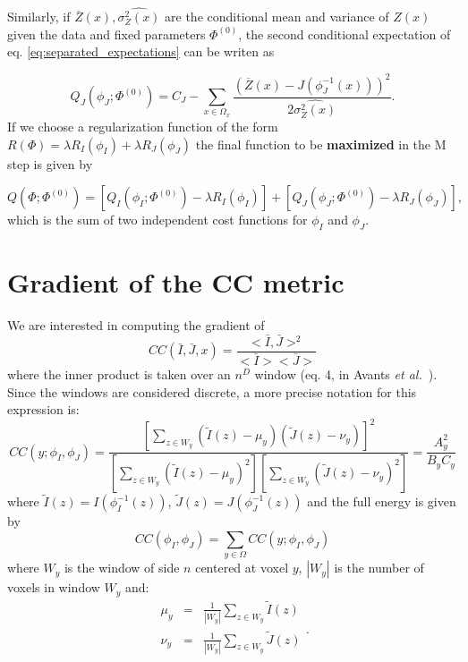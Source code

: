 Similarly, if $\overline{Z}(x), \widehat{\sigma^{2}_{Z}(x)}$ are the conditional mean and variance of $Z(x)$ given the data
and fixed parameters $\Phi^{(0)}$, the second conditional expectation of eq. \eqref{eq:separated_expectations} can be writen as

\begin{equation}
    Q_{J}(\phi_{J}; \Phi^{(0)}) = C_{J} - \sum_{x\in\Omega_{x}}\frac{(\overline{Z}(x) - J(\phi^{-1}_{J}(x)))^{2}}{2\widehat{\sigma^{2}_{Z}(x)}}.
\end{equation}
If we choose a regularization function of the form $R(\Phi) = \lambda R_{I}(\phi_{I}) + \lambda R_{J}(\phi_{J})$ the final function to be \textbf{maximized} in the M step is given by

\begin{equation}
    Q(\Phi; \Phi^{(0)}) = \left[Q_{I}(\phi_{I}; \Phi^{(0)}) - \lambda R_{I}(\phi_{I})\right] + \left[Q_{J}(\phi_{J}; \Phi^{(0)}) - \lambda R_{J}(\phi_{J})\right],
\end{equation}
which is the sum of two independent cost functions for $\phi_{I}$ and $\phi_{J}$.

\section{Gradient of the CC metric}\label{ap:CC_gradient}
We are interested in computing the gradient of
\begin{equation}
    CC(\bar{I}, \bar{J}, x) = \frac{<\bar{I}, \bar{J}>^{2}}{<\bar{I}><\bar{J}>}
\end{equation}
where the inner product is taken over an $n^{D}$ window (eq. 4, in Avants {\it et al.}~\cite{Avants2008}). Since the windows are considered discrete, a more precise notation
for this expression is:
\begin{equation}\label{eq:CC_definition}
    CC(y;\phi_{I}, \phi_{J}) = \frac{\left[\sum_{z\in W_{y}} \left(\tilde{I}(z) - \mu_{y}\right)\left(\tilde{J}(z) - \nu_{y}\right)\right]^{2}}
    {\left[\sum_{z \in W_{y}}\left(\tilde{I}(z) - \mu_{y}\right)^{2}\right] \left[\sum_{z \in W_{y}}\left(\tilde{J}(z) - \nu_{y}\right)^{2}\right]} = \frac{A_{y}^{2}}{B_{y}C_{y}}
\end{equation}
where $\tilde{I}(z) = I(\phi_{I}^{-1}(z))$, $\tilde{J}(z) = J(\phi_{J}^{-1}(z))$ and the full energy is given by
\begin{equation}
    CC(\phi_{I}, \phi_{J}) = \sum_{y\in\Omega} CC(y; \phi_{I}, \phi_{J})
\end{equation}
where $W_{y}$ is the window of side $n$ centered at voxel $y$, $|W_{y}|$ is the number of voxels in window $W_{y}$ and:
\begin{equation}
    \begin{array}{lll}
        \mu_{y} &=& \frac{1}{|W_{y}|}\sum_{z \in W_{y}}\tilde{I}(z)\\[+2mm]
        \nu_{y} &=& \frac{1}{|W_{y}|}\sum_{z \in W_{y}}\tilde{J}(z)\\
    \end{array}.
\end{equation}

